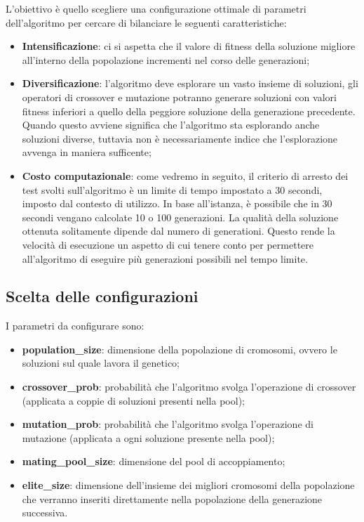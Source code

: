 L'obiettivo è quello scegliere una configurazione ottimale di parametri dell'algoritmo per cercare di bilanciare le seguenti caratteristiche:
\begin{itemize}
	\item\textbf{Intensificazione}: ci si aspetta che il valore di fitness della soluzione migliore all'interno della popolazione incrementi nel corso delle generazioni;
	\item\textbf{Diversificazione}: l'algoritmo deve esplorare un vasto insieme di soluzioni, gli operatori di crossover e mutazione potranno generare soluzioni con valori fitness inferiori a quello della peggiore soluzione della generazione precedente. Quando questo avviene significa che l'algoritmo sta esplorando anche soluzioni diverse, tuttavia non è necessariamente indice che l'esplorazione avvenga in maniera sufficente;
	\item\textbf{Costo computazionale}: come vedremo in seguito, il criterio di arresto dei test svolti sull'algoritmo è un limite di tempo impostato a 30 secondi, imposto dal contesto di utilizzo. In base all'istanza, è possibile che in 30 secondi vengano calcolate 10 o 100 generazioni. La qualità della soluzione ottenuta solitamente dipende dal numero di generationi. Questo rende la velocità di esecuzione un aspetto di cui tenere conto per permettere all'algoritmo di eseguire più generazioni possibili nel tempo limite.
\end{itemize}

\subsection{Scelta delle configurazioni}

I parametri da configurare sono:
\begin{itemize}
	\item\textbf{population\_size}: dimensione della popolazione di cromosomi, ovvero le soluzioni sul quale lavora il genetico;
	\item\textbf{crossover\_prob}: probabilità che l'algoritmo svolga l'operazione di crossover (applicata a coppie di soluzioni presenti nella pool);
	\item\textbf{mutation\_prob}: probabilità che l'algoritmo svolga l'operazione di mutazione (applicata a ogni soluzione presente nella pool);
	\item\textbf{mating\_pool\_size}: dimensione del pool di accoppiamento;
	\item\textbf{elite\_size}: dimensione dell'insieme dei migliori cromosomi della popolazione che verranno inseriti direttamente nella popolazione della generazione successiva.
\end{itemize}

